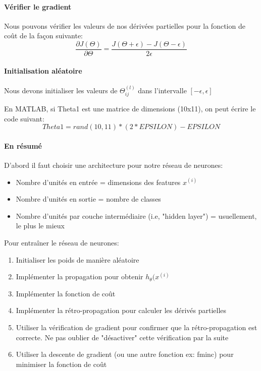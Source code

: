\documentclass{article}
\theoremstyle{definition}
\begin{document}
\paragraph{Vérifier le gradient}
Nous pouvons vérifier les valeurs de nos dérivées partielles pour la fonction de coût de la façon suivante:
$$\frac{\partial J(\Theta)}{\partial \Theta} =  \frac{J(\Theta + \epsilon) - J(\Theta - \epsilon)}{2\epsilon}$$

\paragraph{Initialisation aléatoire}
Nous devons initialiser les valeurs de $\Theta_{ij}^{(l)}$ dans l'intervalle $[-\epsilon, \epsilon]$ \par
En MATLAB, si Theta1 est une matrice de dimensions (10x11), on peut écrire le code suivant:
$$Theta1 = rand(10,11) * (2 * EPSILON) - EPSILON$$
\paragraph{En résumé}
D'abord il faut choisir une architecture pour notre réseau de neurones:
\begin{itemize}
\item Nombre d'unités en entrée = dimensions des features $x^{(i)}$
\item Nombre d'unités en sortie = nombre de classes
\item Nombre d'unités par couche intermédiaire (i.e, "hidden layer") = usuellement, le plus le mieux
\end{itemize}
Pour entraîner le réseau de neurones:
\begin{enumerate}
\item Initialiser les poids de manière aléatoire
\item Implémenter la propagation pour obtenir $h_\theta(x^{(i)}$
\item Implémenter la fonction de coût
\item Implémenter la rétro-propagation pour calculer les dérivés partielles
\item Utiliser la vérification de gradient pour confirmer que la rétro-propagation est correcte. Ne pas oublier de "désactiver" cette vérification par la suite
\item Utiliser la descente de gradient (ou une autre fonction ex: fminc) pour minimiser la fonction de coût
\end{enumerate}
\newpage
\end{document}
